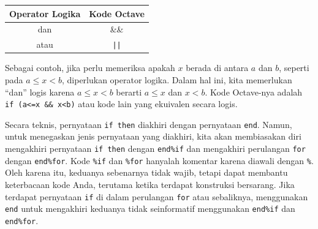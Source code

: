 \begin{center}
\begin{tabular}{c|c}
Operator Logika & Kode Octave\tabularnewline
\hline 
dan & \&\&\tabularnewline
atau & \texttt{||}\tabularnewline
\end{tabular}
\par\end{center}

\noindent Sebagai contoh, jika perlu memeriksa apakah $x$ berada
di antara $a$ dan $b$, seperti pada $a\leq x<b$, diperlukan operator
logika. Dalam hal ini, kita memerlukan ``dan'' logis karena $a\leq x<b$
berarti $a\leq x$ dan $x<b$. Kode Octave-nya adalah \texttt{if (a<=x
\&\& x<b)} atau kode lain yang ekuivalen secara logis.

Secara teknis, pernyataan \texttt{if then} diakhiri dengan pernyataan
\texttt{end}. Namun, untuk menegaskan jenis pernyataan yang diakhiri,
kita akan membiasakan diri mengakhiri pernyataan \texttt{if then}
dengan \texttt{end\%if} dan mengakhiri perulangan \texttt{for} dengan
\texttt{end\%for}. Kode \texttt{\%if} dan \texttt{\%for} hanyalah
komentar karena diawali dengan \texttt{\%}. Oleh karena itu, keduanya
sebenarnya tidak wajib, tetapi dapat membantu keterbacaan kode Anda,
terutama ketika terdapat konstruksi bersarang. Jika terdapat pernyataan
\texttt{if} di dalam perulangan \texttt{for} atau sebaliknya, menggunakan
\texttt{end} untuk mengakhiri keduanya tidak seinformatif menggunakan
\texttt{end\%if} dan \texttt{end\%for}.

